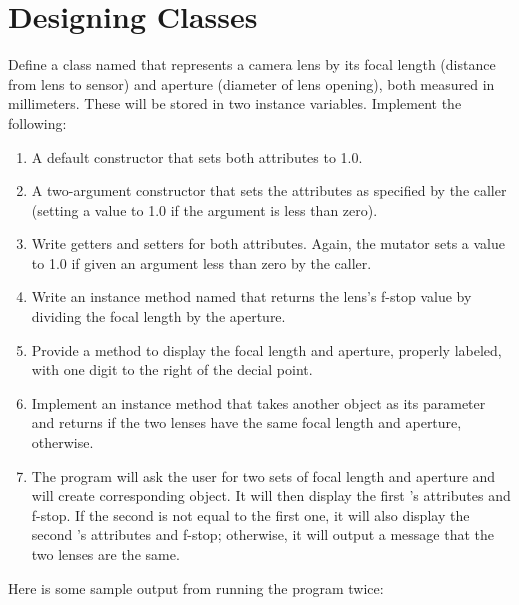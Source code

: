 \chapter{Designing Classes}

\begin{exercise}
Define a class named  that represents a camera lens by its focal length (distance from lens to sensor) and aperture (diameter of lens opening), both measured in millimeters. These will be stored in two  instance variables. Implement the following:

\begin{enumerate}
\item A default constructor that sets both attributes to 1.0.

\item A two-argument constructor that sets the attributes as specified by the caller (setting a value to 1.0 if the argument is less than zero).

\item Write getters and setters for both attributes. Again, the mutator sets a value to 1.0 if given an argument less than zero by the caller.

\item Write an instance method named  that returns the lens's f-stop value by dividing the focal length by the aperture.

\item Provide a  method to display the focal length and aperture, properly labeled, with one digit to the right of the decial point.

\item Implement an  instance method that takes another  object as its parameter and returns  if the two lenses have the same focal length and aperture,  otherwise.

\item The  program will ask the user for two sets of focal length and aperture and will create corresponding  object. It will then display the first 's attributes and f-stop. If the second  is not equal to the first one, it will also display the second 's attributes and f-stop; otherwise, it will output a message that the two lenses are the same.
\end{enumerate}

Here is some sample output from running the program twice:


\end{exercise}
